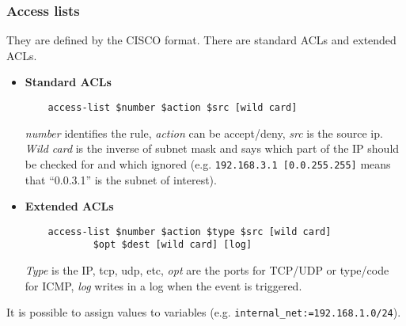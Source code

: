 \documentclass[a4paper, 10pt, titlepage]{article}
\begin{document}
\subsubsection*{Access lists}
They are defined by the CISCO format. There are standard ACLs and extended ACLs.
\begin{itemize}
	\item \textbf{Standard ACLs}
	\begin{lstlisting}
	access-list $number $action $src [wild card]
	\end{lstlisting}
	\textit{number} identifies the rule, \textit{action} can be accept/deny, \textit{src} is the source ip. \textit{Wild card} is the inverse of subnet mask and says which part of the IP should be checked for and which ignored (e.g. \lstinline|192.168.3.1 [0.0.255.255]| means that “0.0.3.1” is the subnet of interest).
	\item \textbf{Extended ACLs}
	\begin{lstlisting}
	access-list $number $action $type $src [wild card] 
			$opt $dest [wild card] [log]
	\end{lstlisting}
	\textit{Type} is the IP, tcp, udp, etc, \textit{opt} are the ports for TCP/UDP or type/code for ICMP, \textit{log} writes in a log when the event is triggered.
\end{itemize}
It is possible to assign values to variables (e.g. \lstinline|internal_net:=192.168.1.0/24|).

\end{document}
